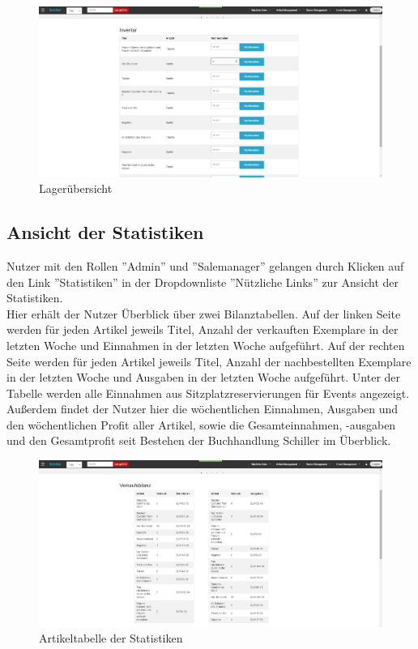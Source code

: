 \documentclass[a4paper]{article}
\begin{document}
\begin{figure}[ht]
\centering
\includegraphics[width=1.0\textwidth]{Lager.jpg}
\caption{Lagerübersicht}
\end{figure}
\smallskip

\FloatBarrier

\subsection{Ansicht der Statistiken}

Nutzer mit den Rollen ''Admin'' und ''Salemanager'' gelangen durch Klicken auf den Link ''Statistiken'' in der Dropdownliste ''Nützliche Links'' zur Ansicht der Statistiken. \\
Hier erhält der Nutzer Überblick über zwei Bilanztabellen. Auf der linken Seite werden für jeden Artikel jeweils Titel, Anzahl der verkauften Exemplare in der letzten Woche und Einnahmen in der letzten Woche aufgeführt. Auf der rechten Seite werden für jeden Artikel jeweils Titel, Anzahl der nachbestellten Exemplare in der letzten Woche und Ausgaben in der letzten Woche aufgeführt. Unter der Tabelle werden alle Einnahmen aus Sitzplatzreservierungen für Events angezeigt. Außerdem findet der Nutzer hier die wöchentlichen Einnahmen, Ausgaben und den wöchentlichen Profit aller Artikel, sowie die Gesamteinnahmen, -ausgaben und den Gesamtprofit seit Bestehen der Buchhandlung Schiller im Überblick.

\begin{figure}[ht]
\centering
\includegraphics[width=1.0\textwidth]{Statistiken1.jpg}
\caption{Artikeltabelle der Statistiken}
\end{figure}
\smallskip
\end{document}
